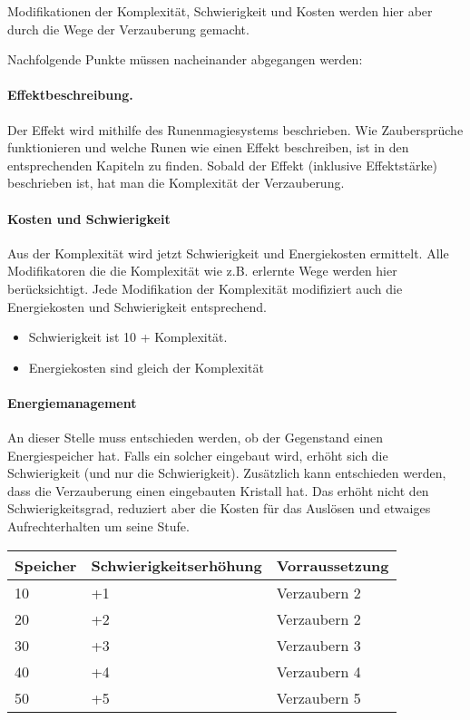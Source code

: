 \documentclass{article}
\begin{document}
Modifikationen der Komplexität, Schwierigkeit und Kosten werden hier aber durch die Wege der Verzauberung gemacht.

Nachfolgende Punkte müssen nacheinander abgegangen werden:

\paragraph{Effektbeschreibung.}

Der Effekt wird mithilfe des Runenmagiesystems beschrieben. Wie Zaubersprüche funktionieren und welche Runen wie
einen Effekt beschreiben, ist in den entsprechenden Kapiteln zu finden. Sobald der Effekt (inklusive Effektstärke)
beschrieben ist, hat man die Komplexität der Verzauberung.

\paragraph{Kosten und Schwierigkeit}

Aus der Komplexität wird jetzt Schwierigkeit und Energiekosten ermittelt. Alle Modifikatoren die die Komplexität wie
z.B. erlernte Wege werden hier berücksichtigt. Jede Modifikation der Komplexität modifiziert auch die Energiekosten
und Schwierigkeit entsprechend.

\begin{itemize}
\item Schwierigkeit ist 10 + Komplexität.
\item Energiekosten sind gleich der Komplexität
\end{itemize}

\paragraph{Energiemanagement}

An dieser Stelle muss entschieden werden, ob der Gegenstand einen Energiespeicher hat. Falls ein solcher eingebaut
wird, erhöht sich die Schwierigkeit (und nur die Schwierigkeit). Zusätzlich kann entschieden werden, dass die
Verzauberung einen eingebauten Kristall hat. Das erhöht nicht den Schwierigkeitsgrad, reduziert aber die Kosten
für das Auslösen und etwaiges Aufrechterhalten um seine Stufe.


\begin{small}
\begin{tabular}{|m{3cm}|m{4cm}|m{3cm}|}
\hline
\textbf{Speicher}&\textbf{Schwierigkeitserhöhung}&\textbf{Vorraussetzung}\\
\hline
\hline
10&+1&Verzaubern 2\\
\hline
20&+2&Verzaubern 2\\
\hline
30&+3&Verzaubern 3\\
\hline
40&+4&Verzaubern 4\\
\hline
50&+5&Verzaubern 5\\
\hline
\end{tabular}
\end{small}
\end{document}
